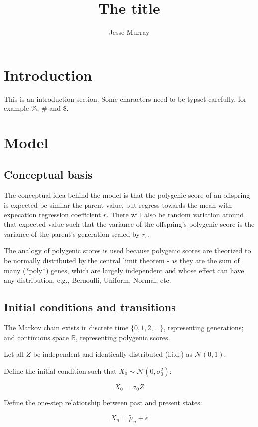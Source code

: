 \documentclass[a4paper,11pt]{article}
\title{The title}
\author{Jesse Murray}
\begin{document}
\maketitle
\thispagestyle{empty}
\newpage
{}

\section{Introduction}
This is an introduction section.
Some characters need to be typset carefully, for example \%, \# and \$.

\section{Model}

\subsection{Conceptual basis}
The conceptual idea behind the model is that the polygenic score of an offspring is expected be similar the parent value, but regress towards the mean with expecation regression coefficient $r$. There will also be random variation around that expected value such that the variance of the offspring's polygenic score is the variance of the parent's generation scaled by $r_s$.

The analogy of polygenic scores is used because polygenic scores are theorized to be normally distributed by the central limit theorem - as they are the sum of many (*poly*) genes, which are largely independent and whose effect can have any distribution, e.g., Bernoulli, Uniform, Normal, etc.

\subsection{Initial conditions and transitions}
The Markov chain exists in discrete time $\{0, 1, 2,...\}$, representing generations; and continuous space $\mathbb{R}$, representing polygenic scores.

Let all $Z$ be independent and identically distributed (i.i.d.) as $\mathcal{N}(0, 1)$.

Define the initial condition such that $X_0 \sim \mathcal{N}(0, \sigma_0^2)$:

$$X_0 = \sigma_0 Z$$

Define the one-step relationship between past and present states:

$$X_n = \tilde{\mu}_n + \epsilon$$
\end{document}
